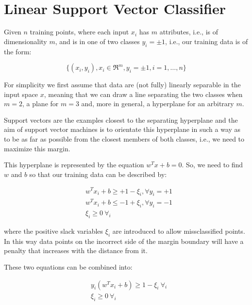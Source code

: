 \section{Linear Support Vector Classifier}

Given $n$ training points, where each input $x_i$ has $m$ attributes, i.e., is of dimensionality $m$, and is in one of two classes $y_i=\pm1$, i.e., our training data is of the form:

\begin{equation}
	\{(x_i,y_i), x_i\in\Re^{m}, y_i=\pm1, i=1, \dots, n\} \label{eq:svc_data}
\end{equation}

For simplicity we first assume that data are (not fully) linearly separable in the input space $x$, meaning that we can draw a line separating the two classes when $m=2$, a plane for $m=3$ and, more in general, a hyperplane for an arbitrary $m$.

Support vectors are the examples closest to the separating hyperplane and the aim of support vector machines is to orientate this hyperplane in such a way as to be as far as possible from the closest members of both classes, i.e., we need to maximize this margin.

This hyperplane is represented by the equation $w^T x + b=0$. So, we need to find $w$ and $b$ so that our training data can be described by:

\begin{equation} \label{eq:svc_consts}
	\begin{aligned}
		& w^T x_i + b \geq +1 - \xi_i, \forall y_i=+1 \\
    	& w^T x_i + b \leq -1 + \xi_i, \forall y_i=-1 \\
    	& \xi_i \geq 0 \ \forall_i
	\end{aligned}
\end{equation}

where the positive slack variables $\xi_i$ are introduced to allow missclassified points. In this way data points on the incorrect side of the margin boundary will have a penalty that increases with the distance from it.

These two equations can be combined into:

\begin{equation} \label{eq:svc_const}
	\begin{aligned}
    	& y_i (w^T x_i + b) \geq 1 - \xi_i \ \forall_i \\
    	& \xi_i\geq 0 \ \forall_i
    \end{aligned}
\end{equation}

